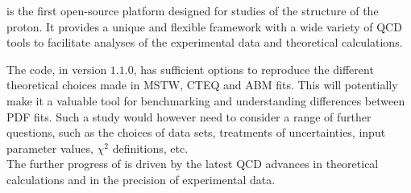 
\label{sec:summary}
\fitter is the first open-source platform designed for studies of the structure of the proton.
It provides a unique and flexible framework with a wide variety of QCD tools to 
facilitate analyses of the experimental data and theoretical calculations. 

The \fitter code, in version $1.1.0$, has sufficient options to reproduce the different 
theoretical choices made in MSTW, CTEQ and ABM fits. This will potentially make it a  
valuable tool for benchmarking and understanding differences between PDF fits. 
Such a study would however need to consider a range of further questions, such as the choices of
data sets, treatments of uncertainties, input parameter values, $\chi^2$ definitions, etc. 
\\
The further progress of \fitter is driven by the latest QCD advances in theoretical calculations 
and in the precision of experimental data.





